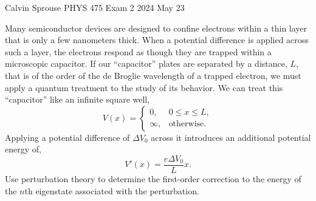 \documentclass[a4paper, 12pt]{config/homework}
\begin{document}
\noindent
Calvin Sprouse \hfill PHYS 475 Exam 2 \hfill 2024 May 23
\bigskip

\noindent
Many semiconductor devices are designed to confine electrons within a thin layer that is only a few nanometers thick. When a potential difference is applied across such a layer, the electrons respond as though they are trapped within a microscopic capacitor. If our ``capacitor'' plates are separated by a distance, \(L\), that is of the order of the de Broglie wavelength of a trapped electron, we must apply a quantum treatment to the study of its behavior. We can treat this ``capacitor'' like an infinite square well,
\[V(x) = \begin{cases}
0, & 0 \le x \le L, \\
\infty, & \text{otherwise}.
\end{cases}\]
Applying a potential difference of \(\Delta V_0\) across it introduces an additional potential energy of,
\[V'(x) = \frac{e\Delta V_0}{L}x.\]
Use perturbation theory to determine the first-order correction to the energy of the \(n\)th eigenstate associated with the perturbation.
\end{document}
